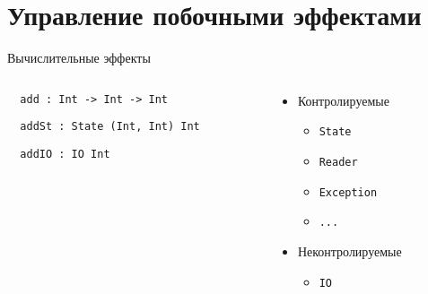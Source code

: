 \section{Управление побочными эффектами}


\begin{frame}[fragile]{Вычислительные эффекты}
\begin{columns}
\begin{column}{0.55\textwidth}
  \begin{block}{}
  \begin{verbatim}
  add : Int -> Int -> Int
  \end{verbatim}
  \end{block}
  \begin{block}{}
  \begin{verbatim}
  addSt : State (Int, Int) Int
  \end{verbatim}
  \end{block}
  \begin{block}{}
  \begin{verbatim}
  addIO : IO Int
  \end{verbatim}
  \end{block}
\end{column}
\begin{column}{0.4\textwidth}
  \begin{itemize}
    \item Контролируемые
    \begin{itemize}
      \item \texttt{State}
      \item \texttt{Reader}
      \item \texttt{Exception}
      \item \texttt{...}
    \end{itemize}
    \item Неконтролируемые
    \begin{itemize}
      \item \texttt{IO}
    \end{itemize}
  \end{itemize}
\end{column}
\end{columns}
\end{frame}

